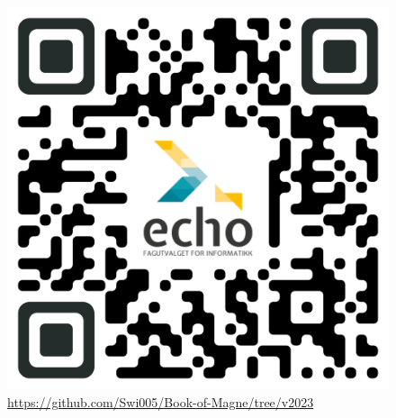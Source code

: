     \begin{figure}[!h]
        \centering
        \includegraphics[scale=0.3]{assets/qrcode.png}
        \caption{\url{https://github.com/Swi005/Book-of-Magne/tree/v2023}}
        \label{fig:qr}
    \end{figure}

